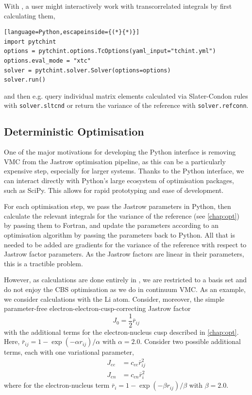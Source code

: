 With \pytchint, a user might interactively work with transcorrelated integrals by first calculating them,
\begin{lstlisting}[language=Python,escapeinside={(*}{*)}]
import pytchint
options = pytchint.options.TcOptions(yaml_input="tchint.yml")
options.eval_mode = "xtc"
solver = pytchint.solver.Solver(options=options)
solver.run()
\end{lstlisting}
and then e.g. query individual matrix elements calculated via Slater-Condon rules with \texttt{solver.sltcnd} or return the variance of the reference with \texttt{solver.refconn}.

\subsection{Deterministic Optimisation}

One of the major motivations for developing the Python interface is removing VMC from the Jastrow optimisation pipeline, as this can be a particularly expensive step, especially for larger systems. Thanks to the Python interface, we can interact directly with Python's large ecosystem of optimisation packages, such as SciPy.\supercite{2020SciPy-NMeth} This allows for rapid prototyping and ease of development.

For each optimisation step, we pass the Jastrow parameters in Python, then calculate the relevant integrals for the variance of the reference (see \autoref{chap:opt}) by passing them to Fortran, and update the parameters according to an optimisation algorithm by passing the parameters back to Python. All that is needed to be added are gradients for the variance of the reference with respect to Jastrow factor parameters. As the Jastrow factors are linear in their parameters, this is a tractible problem.

However, as calculations are done entirely in \pytchint, we are restricted to a basis set and do not enjoy the \gls{CBS} optimisation as we do in continuum \gls{VMC}. As an example, we consider calculations with the Li atom. Consider, moreover, the simple parameter-free electron-electron-cusp-correcting Jastrow factor
\begin{equation}
    J_0 = \frac 12 \bar r_{ij}
\end{equation}
with the additional terms for the electron-nucleus cusp described in \autoref{chap:opt}. Here, $\bar r_{ij} = 1 - \exp(-\alpha r_{ij})/\alpha$ with $\alpha=2.0$. Consider two possible additional terms, each with one variational parameter,
\begin{align}
    J_{ee} &= c_{ee}\bar r_{ij}^2 \\
    J_{en} &= c_{en}\bar r_{i}^2
\end{align}
where for the electron-nucleus term $\bar r_{i} = 1 - \exp(-\beta r_{ij})/\beta$ with $\beta=2.0$.


